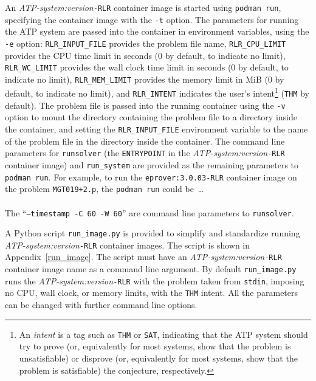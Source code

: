 \documentclass{easychair}
\begin{document}
An {\em ATP-system:version}{\tt -RLR} container image is started using {\tt podman run}, specifying 
the container image with the {\tt -t} option.
The parameters for running the ATP system are passed into the container in environment variables,
using the {\tt -e} option:
{\tt RLR\_INPUT\_FILE} provides the problem file name,
{\tt RLR\_CPU\_LIMIT} provides the CPU time limit in seconds (0 by default, to indicate no limit),
{\tt RLR\_WC\_LIMIT} provides the wall clock time limit in seconds (0 by default, to indicate no 
limit),
{\tt RLR\_MEM\_LIMIT} provides the memory limit in MiB (0 by default, to indicate no limit),
and
{\tt RLR\_INTENT} indicates the user's intent\footnote{%
An {\em intent} is a tag such as {\tt THM} or {\tt SAT}, indicating that the ATP system should
try to prove (or, equivalently for most systems, show that the problem is unsatisfiable) or 
disprove (or, equivalently for most systems, show that the problem is satisfiable) the conjecture, 
respectively.}
({\tt THM} by default).
The problem file is passed into the running container using the {\tt -v} option to mount 
the directory containing the problem file to a directory inside the container, and setting the
{\tt RLR\_INPUT\_FILE} environment variable to the name of the problem file in the directory 
inside the container.
The command line parameters for {\tt runsolver} (the {\tt ENTRYPOINT} in the 
{\em ATP-system:version}{\tt -RLR} container image) and {\tt run\_system} are provided as the
remaining parameters to {\tt podman run}.
For example, to run the {\tt eprover:3.0.03-RLR} container image on the problem {\tt MGT019+2.p},
the {\tt podman run} could be~\ldots \\
\hspace*{1cm}{\tt podman run -t eprover:3.0.03-RLR -v .:/artifacts/CWD \\
-e RLR\_INPUT\_FILE='/artifacts/CWD/MGT019+2.p' -e RLR\_CPU\_LIMIT='60' \\
-e RLR\_WC\_LIMIT='60' -e RLR\_MEM\_LIMIT='0' -e RLR\_INTENT='SAT' \\
--timestamp -C 60 -W 60 run\_system} \\
The ``{\tt --timestamp -C 60 -W 60}'' are command line parameters to {\tt runsolver}.

A Python script {\tt run\_image.py} is provided to simplify and standardize running 
{\em ATP-system:version}{\tt -RLR} container images.
The script is shown in Appendix~\ref{run_image}.
The script must have an {\em ATP-system:version}{\tt -RLR} container image name as a 
command line argument.
By default {\tt run\_image.py} runs the {\em ATP-system:version}{\tt -RLR} with the problem 
taken from {\tt stdin}, imposing no CPU, wall clock, or memory limits, with the {\tt THM} intent.
All the parameters can be changed with further command line options.
\end{document}
